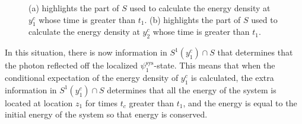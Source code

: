\documentclass[12pt]{report}
\providecommand{\DIFaddbeginFL}{} %
\providecommand{\DIFaddendFL}{} %
\providecommand{\DIFdelbeginFL}{} %
\providecommand{\DIFdelendFL}{} %
\begin{document}
\begin{figure}[ht!]


\vspace*{2px}
\DIFdelbeginFL %
\DIFdelendFL \DIFaddbeginFL \caption[Photon measurements for energy density calculations at $y^c_1$ and $y^c_2$]{\DIFaddendFL (a) highlights the part of $S$ used to calculate the energy density at $y^c_1$ whose time is greater than $t_1$. (b) highlights the part of $S$ used to calculate the energy density at $y^c_2$ whose time is greater than $t_1$.}
\label{TM4}
\end{figure}

In this situation, there is now information in $S^1(y^c_1)\cap S$ that determines that the photon reflected off the localized $\psi_1^\text{sys}$-state. This means that when the conditional expectation of the energy density of $y^c_1$ is calculated, the extra information in $S^1(y^c_1)\cap S$ determines that all the energy of the system is located at location $z_1$ for times $t_c$ greater than $t_1$, and the energy is equal to the initial energy of the system so that energy is conserved.
\end{document}
